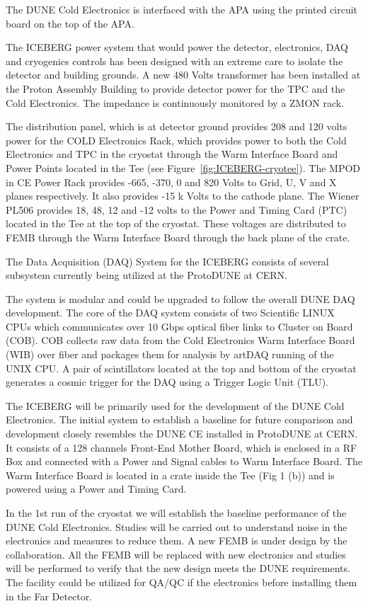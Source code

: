 The DUNE Cold Electronics is interfaced with the APA using the printed circuit board on the top of the APA.

The ICEBERG power system that would power the detector, electronics, DAQ and cryogenics controls has been designed with an extreme care to isolate the detector and building grounds. A new 480 Volts transformer has been installed at the Proton Assembly Building to provide detector power for the TPC and the Cold Electronics. The impedance is continuously monitored by a ZMON rack. 

The distribution panel, which is at detector ground provides 208 and 120 volts power for the COLD Electronics Rack, which provides power to both the Cold Electronics and TPC in the cryostat through the Warm Interface Board and Power Points located in the Tee (see Figure~\ref{fig:ICEBERG-cryotee}). The MPOD in CE Power Rack provides -665, -370, 0 and 820 Volts to Grid, U, V and X planes respectively. It also provides -15 k Volts to the cathode plane. The Wiener PL506 provides 18, 48, 12 and -12 volts to the Power and Timing Card (PTC) located in the Tee at the top of the cryostat. These voltages are distributed to FEMB through the Warm Interface Board through the back plane of the crate.

The Data Acquisition (DAQ) System for the ICEBERG consists of several subsystem currently being utilized at the ProtoDUNE at CERN.

The system is modular and could be upgraded to follow the overall DUNE DAQ development. The core of the DAQ system consists of two Scientific LINUX CPUs which communicates over 10 Gbps optical fiber links to Cluster on Board (COB). COB collects raw data from the Cold Electronics Warm Interface Board (WIB) over fiber and packages them for analysis by artDAQ running of the UNIX CPU. A pair of scintillators located at the top and bottom of the cryostat generates a cosmic trigger for the DAQ  using a Trigger Logic Unit (TLU).

The ICEBERG will be primarily used for the development of the DUNE Cold Electronics. The initial system to establish a baseline for future comparison and development closely resembles the DUNE CE installed in ProtoDUNE at CERN. It consists of a 128 channels Front-End Mother Board, which is enclosed in a RF Box and connected with a Power and Signal cables to Warm Interface Board. The Warm Interface Board is located in a crate inside the Tee (Fig 1 (b)) and is powered using a Power and Timing Card.

In the 1st run of the cryostat we will establish the baseline performance of the DUNE Cold Electronics. Studies will be carried out to understand noise in the electronics and measures to reduce them. A new FEMB is under design by the collaboration. All the FEMB will be replaced with new electronics and studies will be performed to verify that the new design meets the DUNE requirements. The facility could be utilized for QA/QC if the electronics before installing them in the Far Detector.

